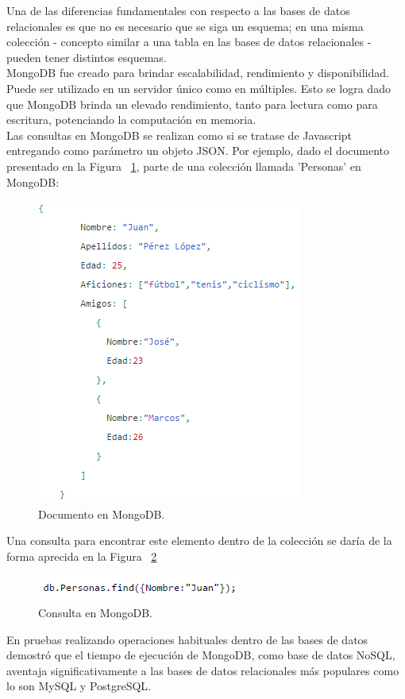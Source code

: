 	Una de las diferencias fundamentales con respecto a las bases de datos relacionales es que no es necesario que se siga un esquema; en una misma colección - concepto similar a una tabla en las bases de datos relacionales - pueden tener distintos esquemas.\\

	MongoDB fue creado para brindar escalabilidad, rendimiento y disponibilidad. Puede ser utilizado en un servidor único como en múltiples. Esto se logra dado que MongoDB brinda un elevado rendimiento, tanto para lectura como para escritura, potenciando la computación en memoria.\\

	Las consultas en MongoDB se realizan como si se tratase de Javascript entregando como parámetro un objeto JSON. Por ejemplo, dado el documento presentado en la Figura ~\ref{fig:MongoJsonExample}, parte de una colección llamada 'Personas' en MongoDB:

	\begin{figure}[H]
		\centering
		\captionsetup{justification=centering}
		\includegraphics[scale=0.8]{images/MongoJsonExample.png}
		\caption[Documento en MongoDB.]{Documento en MongoDB.}
		\label{fig:MongoJsonExample}
	\end{figure}


	Una consulta para encontrar este elemento dentro de la colección se daría de la forma aprecida en la Figura ~\ref{fig:MongoJsonQueryExample}\\

	

	\begin{figure}[H]
		\centering
		\captionsetup{justification=centering}
		\includegraphics[scale=0.8]{images/MongoJsonQueryExample.png}
		\caption[Consulta en MongoDB.]{Consulta en MongoDB.}
		\label{fig:MongoJsonQueryExample}
	\end{figure}


	En pruebas realizando operaciones habituales dentro de las bases de datos \cite{MongoPerformance} demostró que el tiempo de ejecución de MongoDB, como base de datos NoSQL, aventaja significativamente a las bases de datos relacionales más populares como lo son MySQL y PostgreSQL.


	